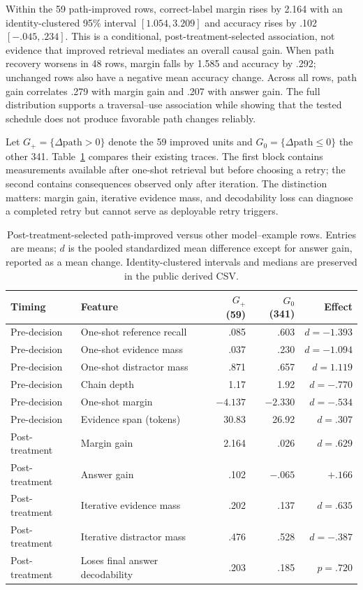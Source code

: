 Within the 59 path-improved rows, correct-label margin rises by 2.164 with an identity-clustered
95\% interval $[1.054,3.209]$ and accuracy rises by .102 $[-.045,.234]$.  This is a conditional,
post-treatment-selected association, not evidence that improved retrieval mediates an overall causal
gain.  When path recovery worsens in 48 rows, margin falls by 1.585 and accuracy by .292; unchanged
rows also have a negative mean accuracy change.  Across all rows, path gain correlates .279 with
margin gain and .207 with answer gain.  The full distribution supports a traversal--use association
while showing that the tested schedule does not produce favorable path changes reliably.

Let $G_+=\{\Delta\mathrm{path}>0\}$ denote the 59 improved units and
$G_0=\{\Delta\mathrm{path}\leq0\}$ the other 341.  Table~\ref{tab:iteration-benefit}
compares their existing traces.  The first block contains measurements available after one-shot
retrieval but before choosing a retry; the second contains consequences observed only after
iteration.  The distinction matters: margin gain, iterative evidence mass, and decodability loss can diagnose
a completed retry but cannot serve as deployable retry triggers.

\begin{table}[H]
\centering
\caption{Post-treatment-selected path-improved versus other model--example rows.  Entries are means;
$d$ is the pooled standardized mean difference except for answer gain, reported as a mean change.
Identity-clustered intervals and medians are preserved in the public derived CSV.}
\label{tab:iteration-benefit}
\small
\begin{tabular}{llrrr}
\toprule
Timing & Feature & $G_+$ (59) & $G_0$ (341) & Effect \\
\midrule
Pre-decision & One-shot reference recall & .085 & .603 & $d=-1.393$ \\
Pre-decision & One-shot evidence mass & .037 & .230 & $d=-1.094$ \\
Pre-decision & One-shot distractor mass & .871 & .657 & $d=1.119$ \\
Pre-decision & Chain depth & 1.17 & 1.92 & $d=-.770$ \\
Pre-decision & One-shot margin & $-4.137$ & $-2.330$ & $d=-.534$ \\
Pre-decision & Evidence span (tokens) & 30.83 & 26.92 & $d=.307$ \\
\midrule
Post-treatment & Margin gain & 2.164 & .026 & $d=.629$ \\
Post-treatment & Answer gain & .102 & $-.065$ & $+.166$ \\
Post-treatment & Iterative evidence mass & .202 & .137 & $d=.635$ \\
Post-treatment & Iterative distractor mass & .476 & .528 & $d=-.387$ \\
Post-treatment & Loses final answer decodability & .203 & .185 & $p=.720$ \\
\bottomrule
\end{tabular}
\end{table}


